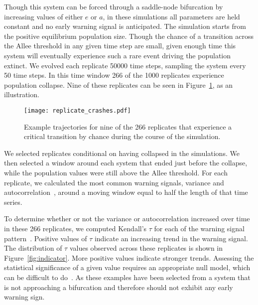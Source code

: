 \documentclass[authoryear,review,12pt]{elsarticle}
\begin{document}
Though this system can be forced through a saddle-node bifurcation by
increasing values of either $e$ or $a$, in these simulations all parameters
are held constant and no early warning signal is anticipated.
The simulation starts from the positive equilibrium population size.
Though the chance of a transition across the Allee threshold in any 
given time step are small, given enough time this system will eventually
experience such a rare event driving the population extinct.  We evolved
each replicate 50000 time steps, sampling the system every 50 time steps.  
In this time window 266 of the 1000 replicates experience population collapse.  
Nine of these replicates can be seen in Figure~\ref{fig:replicate_crashes},
as an illustration. 

  \begin{figure}[H]
    \begin{center}
      \texttt{[image: replicate\_crashes.pdf]}
    \end{center}
    \caption{Example trajectories for nine of the 266 replicates that 
             experience a critical transition by chance during the course
             of the simulation.}
    \label{fig:replicate_crashes}
  \end{figure}


We selected replicates conditional on having collapsed in the simulations.
We then selected a window around each system that ended just before the
collapse, while the population values were still above the Allee threshold.
For each replicate, we calculated the most common warning signals, variance
and autocorrelation~\citep[\emph{e.g.}][]{Carpenter2006,Dakos2008,Scheffer2009}, 
around a moving window equal to half the length of that time series.  

To determine whether or not the variance or autocorrelation increased 
over time in these 266 replicates, we computed Kendall's $\tau$ for each of the
warning signal pattern~\citep{Dakos2008, Dakos2011}.  Positive values of $\tau$ 
indicate an increasing trend in the warning signal.  The distribution of $\tau$ 
values observed across these replicates is shown in Figure~\ref{fig:indicator}.
More positive values indicate stronger trends. Assessing the statistical significance
of a given value requires an appropriate null model, which can be difficult 
to do~\citep{Dakos2008}. As these examples have been selected from a system
that is not approaching a bifurcation and therefore should not exhibit any 
early warning sign. %
\end{document}
